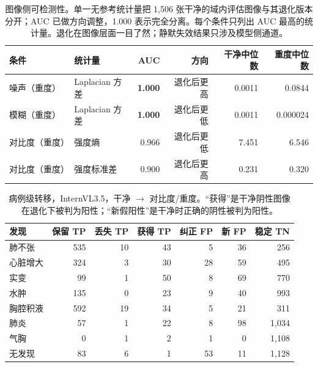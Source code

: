\begin{table}[H]
\centering
\small
\caption{图像侧可检测性。单一无参考统计量把 1,506 张干净的域内评估图像与其退化版本分开；AUC 已做方向调整，1.000 表示完全分离。每个条件只列出 AUC 最高的统计量。退化在图像层面一目了然；静默失效结果只涉及模型侧通道。}
\label{tab:imageside}
\begin{tabular}{llrrrr}
\toprule
条件 & 统计量 & AUC & 方向 & 干净中位数 & 重度中位数 \\
\midrule
噪声（重度） & Laplacian 方差 & \textbf{1.000} & 退化后更高 & 0.0011 & 0.0844 \\
模糊（重度） & Laplacian 方差 & \textbf{1.000} & 退化后更低 & 0.0011 & 0.000024 \\
对比度（重度） & 强度熵 & 0.966 & 退化后更低 & 7.451 & 6.546 \\
对比度（重度） & 强度标准差 & 0.900 & 退化后更高 & 0.231 & 0.320 \\
\bottomrule
\end{tabular}
\end{table}

\begin{table}[H]
\centering
\small
\caption{病例级转移，InternVL3.5，干净 $\rightarrow$ 对比度/重度。``获得''是干净阴性图像在退化下被判为阳性；``新假阳性''是干净时正确的阴性被判为阳性。}
\label{tab:flip}
\begin{tabular}{lrrrrrr}
\toprule
发现 & 保留 TP & 丢失 TP & 获得 TP & 纠正 FP & 新 FP & 稳定 TN \\
\midrule
肺不张 & 535 & 10 & 43 & 5 & 36 & 256 \\
心脏增大 & 324 & 3 & 30 & 28 & 59 & 495 \\
实变 & 99 & 1 & 50 & 8 & 69 & 770 \\
水肿 & 135 & 0 & 23 & 9 & 40 & 993 \\
胸腔积液 & 592 & 19 & 34 & 5 & 21 & 311 \\
肺炎 & 57 & 1 & 22 & 8 & 98 & 1,034 \\
气胸 & 0 & 1 & 2 & 1 & 0 & 1,108 \\
无发现 & 83 & 6 & 1 & 53 & 11 & 1,128 \\
\bottomrule
\end{tabular}
\end{table}

